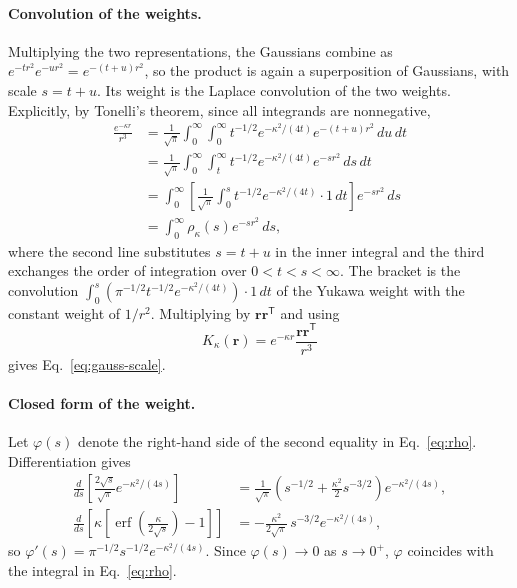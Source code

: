 \documentclass[11pt]{article}
\theoremstyle{plain}
\newcommand{\rr}{\bm r}
\newcommand{\erf}{\operatorname{erf}}
\DeclareRobustCommand{\_}{\textunderscore\allowbreak}
\begin{document}
\paragraph{Convolution of the weights.}
Multiplying the two representations, the Gaussians combine as
$e^{-t r^2}e^{-u r^2}=e^{-(t+u)r^2}$, so the product is again a
superposition of Gaussians, with scale $s=t+u$. Its weight is the
Laplace convolution of the two weights. Explicitly, by Tonelli's
theorem, since all integrands are nonnegative,
\begin{align}
\frac{e^{-\kappa r}}{r^3}
&=
\frac{1}{\sqrt{\pi}}
\int_0^\infty
\int_0^\infty
t^{-1/2}
e^{-\kappa^2/(4t)}
e^{-(t+u) r^2}\,du\,dt
\\
&=
\frac{1}{\sqrt{\pi}}
\int_0^\infty
\int_t^\infty
t^{-1/2}
e^{-\kappa^2/(4t)}
e^{-s r^2}\,ds\,dt
\\
&=
\int_0^\infty
\left[
\frac{1}{\sqrt{\pi}}
\int_0^s
t^{-1/2}
e^{-\kappa^2/(4t)}\cdot 1\,dt
\right]
e^{-s r^2}\,ds
\\
&=
\int_0^\infty
\rho_\kappa(s)e^{-s r^2}\,ds,
\end{align}
where the second line substitutes $s=t+u$ in the inner integral and the
third exchanges the order of integration over $0<t<s<\infty$. The
bracket is the convolution
$\int_0^s(\pi^{-1/2}t^{-1/2}e^{-\kappa^2/(4t)})\cdot1\,dt$ of the
Yukawa weight with the constant weight of $1/r^2$. Multiplying by
$\rr\rr^{\mathsf T}$ and using
\begin{equation}
K_\kappa(\rr)
=
e^{-\kappa r}\frac{\rr\rr^{\mathsf T}}{r^3}
\end{equation}
gives Eq.~\eqref{eq:gauss-scale}.

\paragraph{Closed form of the weight.}
Let $\varphi(s)$ denote the right-hand side of the second equality in
Eq.~\eqref{eq:rho}. Differentiation gives
\begin{align}
\frac{d}{ds}
\left[
\frac{2\sqrt{s}}{\sqrt{\pi}}e^{-\kappa^2/(4s)}
\right]
&=
\frac{1}{\sqrt{\pi}}
\left(
s^{-1/2}+\frac{\kappa^2}{2}s^{-3/2}
\right)
e^{-\kappa^2/(4s)},
\\
\frac{d}{ds}
\left[
\kappa\left[\erf\!\left(\frac{\kappa}{2\sqrt s}\right)-1\right]
\right]
&=
-\frac{\kappa^2}{2\sqrt{\pi}}\,s^{-3/2}e^{-\kappa^2/(4s)},
\end{align}
so $\varphi'(s)=\pi^{-1/2}s^{-1/2}e^{-\kappa^2/(4s)}$. Since
$\varphi(s)\to0$ as $s\to0^+$, $\varphi$ coincides with the integral
in Eq.~\eqref{eq:rho}.
\end{document}
